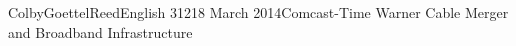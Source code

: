 \documentclass[12pt]{article}
\begin{document}
\begin{mla}{Colby}{Goettel}{Reed}{English 312}{18 March 2014}{Comcast-Time Warner Cable Merger and Broadband Infrastructure}

















\begin{workscited}
    \bibent 
\end{workscited}

\end{mla}
\end{document}
